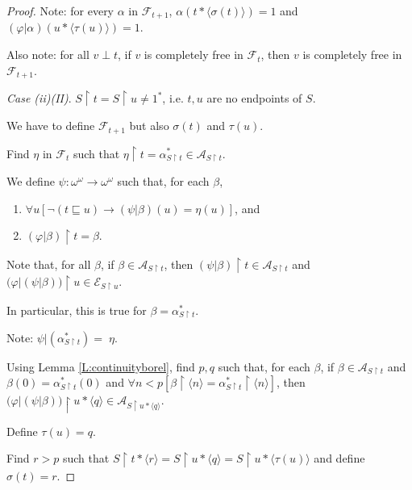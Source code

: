 \documentclass[a4paper]{amsart}
\theoremstyle{plain}
\begin{document}
\begin{proof}
 \smallskip
 Note: for every $\alpha$ in $\mathcal{F}_{t+1}$, $\alpha(t\ast\langle \sigma(t)\rangle) =1$ and $(\varphi|\alpha)(u\ast\langle \tau(u)\rangle)=1$.
 
 Also note: for all $v\perp t$, if $v$ is  completely free in $\mathcal{F}_t$, then $v$ is completely free in $\mathcal{F}_{t+1}$.
 
 \medskip
 
 {\it Case (ii)(II)}. $S\upharpoonright t= S\upharpoonright u \neq 1^\ast$, i.e. $t,u$ are no endpoints    of $S$.
 
  We have  to define $\mathcal{F}_{t+1}$ but also $\sigma(t)$ and $\tau(u)$.
   
   
    
    Find $\eta$ in $\mathcal{F}_t$ such that $\eta\upharpoonright t =\alpha^\ast_{S\upharpoonright t}\in \mathcal{A}_{S\upharpoonright t}$. 
   
  
   
   We define $\psi:\omega^\omega\rightarrow\omega^\omega$ such that, for each $\beta$,  \begin{enumerate}[\upshape (1)] \item  $\forall u[\neg (t\sqsubseteq u)\rightarrow (\psi|\beta)(u)=\eta(u)]$, and  \item $(\varphi|\beta)\upharpoonright t=\beta$.
   
    \end{enumerate}
   
Note that, for all $\beta$, if $\beta \in \mathcal{A}_{S\upharpoonright t}$, then $(\psi|\beta)\upharpoonright t \in \mathcal{A}_{S \upharpoonright t}$ and $\bigl(\varphi|(\psi|\beta)\bigr)\upharpoonright u \in \mathcal{E}_{S\upharpoonright u}$.

In particular, this is true for $\beta= \alpha^\ast_{S\upharpoonright t}$.

Note: $\psi|(\alpha^\ast_{S\upharpoonright t})=\;\eta$.

Using Lemma \ref{L:continuityborel}, find $p, q$ such that, for each $\beta$, if  $\beta \in\mathcal{A}_{S\upharpoonright t}$ and $\beta(0)=\alpha^\ast_{S\upharpoonright t}(0)$ and $\forall n <p[\beta\upharpoonright \langle n \rangle = \alpha^\ast_{S\upharpoonright t}\upharpoonright \langle n \rangle]$, then $\bigl(\varphi|(\psi|\beta)\bigr)\upharpoonright u\ast\langle q\rangle \in \mathcal{A}_{S\upharpoonright u\ast\langle q \rangle}$. 

Define  $\tau(u)=q$.

Find $r>p$ such that $S\upharpoonright t\ast\langle r \rangle = S\upharpoonright u\ast\langle q \rangle = S\upharpoonright u \ast\langle \tau(u)\rangle$ and define $\sigma(t)=r$. 



\end{proof}
\end{document}
